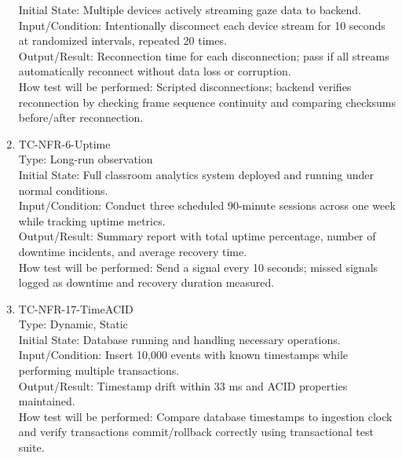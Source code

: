\documentclass[12pt, titlepage]{article}
\begin{document}
\begin{enumerate}
Initial State: Multiple devices actively streaming gaze data to backend.\\

Input/Condition: Intentionally disconnect each device stream for 10 seconds at randomized intervals, repeated 20 times.\\

Output/Result: Reconnection time for each disconnection; pass if all streams automatically reconnect without data loss or corruption.\\

How test will be performed: Scripted disconnections; backend verifies reconnection by checking frame sequence continuity and comparing checksums before/after reconnection.

\item{TC-NFR-6-Uptime\\}
Type: Long-run observation\\

Initial State: Full classroom analytics system deployed and running under normal conditions.\\

Input/Condition: Conduct three scheduled 90-minute sessions across one week while tracking uptime metrics.\\

Output/Result: Summary report with total uptime percentage, number of downtime incidents, and average recovery time.\\

How test will be performed: Send a signal every 10 seconds; missed signals logged as downtime and recovery duration measured.

\item{TC-NFR-17-TimeACID\\}
Type: Dynamic, Static\\

Initial State: Database running and handling necessary operations.\\

Input/Condition: Insert 10,000 events with known timestamps while performing multiple transactions.\\

Output/Result: Timestamp drift within 33 ms and ACID properties maintained.\\

How test will be performed: Compare database timestamps to ingestion clock and verify transactions commit/rollback correctly using transactional test suite.


\end{enumerate}
\end{document}
